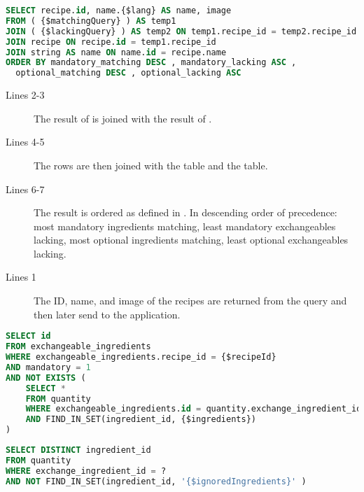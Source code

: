 \begin{lstlisting}[language=SQL, float=h, label={}, caption={\$sortingQuery, combine and sort.}]
SELECT recipe.id, name.{$lang} AS name, image
FROM ( {$matchingQuery} ) AS temp1
JOIN ( {$lackingQuery} ) AS temp2 ON temp1.recipe_id = temp2.recipe_id
JOIN recipe ON recipe.id = temp1.recipe_id
JOIN string AS name ON name.id = recipe.name
ORDER BY mandatory_matching DESC , mandatory_lacking ASC ,
  optional_matching DESC , optional_lacking ASC
\end{lstlisting}

\begin{description}
\item[Lines 2-3] The result of  is joined with the result of .
\item[Lines 4-5] The rows are then joined with the  table and the  table. 
\item[Lines 6-7] The result is ordered as defined in . In descending order of precedence: most mandatory ingredients matching, least mandatory exchangeables lacking, most optional ingredients matching, least optional exchangeables lacking.
\item[Lines 1] The ID, name, and image of the recipes are returned from the query and then later send to the application.
\end{description}










\begin{lstlisting}[language=SQL, morekeywords={FIND_IN_SET}, float=h, label={}, caption={Query to find the exchangeables that are not covered.}]
SELECT id
FROM exchangeable_ingredients
WHERE exchangeable_ingredients.recipe_id = {$recipeId}
AND mandatory = 1
AND NOT EXISTS (
    SELECT * 
    FROM quantity
    WHERE exchangeable_ingredients.id = quantity.exchange_ingredient_id
    AND FIND_IN_SET(ingredient_id, {$ingredients})
)
\end{lstlisting}

\begin{lstlisting}[language=SQL, morekeywords={FIND_IN_SET}, float=h, label={}, caption={Query to get the ingredient of an exchangeable, excluding ignored ingredients.}]
SELECT DISTINCT ingredient_id
FROM quantity
WHERE exchange_ingredient_id = ?
AND NOT FIND_IN_SET(ingredient_id, '{$ignoredIngredients}' )
\end{lstlisting}








